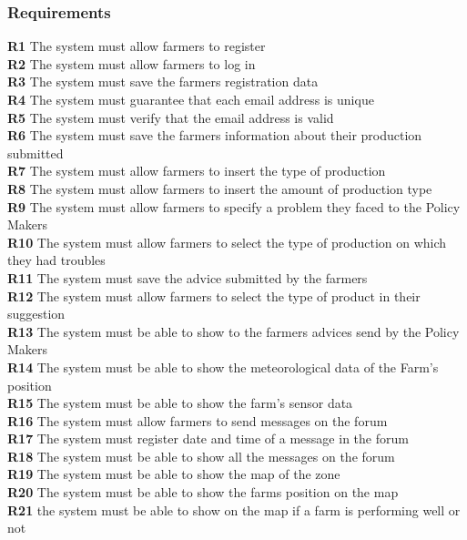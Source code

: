 \subsubsection{Requirements}
\textbf{R1} The system must allow farmers to register\\
\textbf{R2} The system must allow farmers to log in\\
\textbf{R3} The system must save the farmers registration data\\
\textbf{R4} The system must guarantee that each email address is unique\\
\textbf{R5} The system must verify that the email address is valid\\
\textbf{R6} The system must save the farmers information about their production submitted\\
\textbf{R7} The system must allow farmers to insert the type of production \\
\textbf{R8} The system must allow farmers to insert the amount of production type\\
\textbf{R9} The system must allow farmers to specify a problem they faced to the Policy Makers\\
\textbf{R10} The system must allow farmers to select the type of production on which they had troubles\\
\textbf{R11} The system must save the advice submitted by the farmers\\
\textbf{R12} The system must allow farmers to select the type of product in their suggestion\\
\textbf{R13} The system must be able to show to the farmers advices send by the Policy Makers\\
\textbf{R14} The system must be able to show the meteorological data of the Farm’s position\\
\textbf{R15} The system must be able to show the farm’s sensor data \\
\textbf{R16} The system must allow farmers to send messages on the forum\\
\textbf{R17} The system must register date and time of a message in the forum\\
\textbf{R18} The system must be able to show all the messages on the forum\\
\textbf{R19} The system must be able to show the map of the zone\\
\textbf{R20} The system must be able to show the farms position on the map\\
\textbf{R21} the system must be able to show on the map if a farm is performing well or not \\
